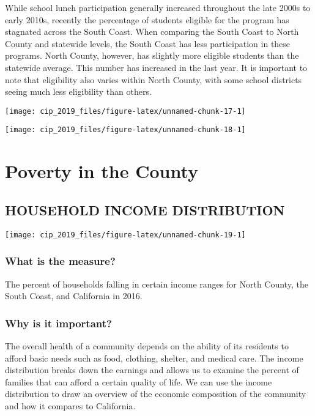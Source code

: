 \documentclass[]{book}
\theoremstyle{definition}
\theoremstyle{definition}
\theoremstyle{definition}
\theoremstyle{remark}
\begin{document}
While school lunch participation generally increased throughout the late
2000s to early 2010s, recently the percentage of students eligible for
the program has stagnated across the South Coast. When comparing the
South Coast to North County and statewide levels, the South Coast has
less participation in these programs. North County, however, has
slightly more eligible students than the statewide average. This number
has increased in the last year. It is important to note that eligibility
also varies within North County, with some school districts seeing much
less eligibility than others.

\texttt{[image: cip\_2019\_files/figure-latex/unnamed-chunk-17-1]}

\texttt{[image: cip\_2019\_files/figure-latex/unnamed-chunk-18-1]}

\section*{Poverty in the County}\label{poverty-in-the-county}

\subsection*{HOUSEHOLD INCOME
DISTRIBUTION}\label{household-income-distribution}

\texttt{[image: cip\_2019\_files/figure-latex/unnamed-chunk-19-1]}

\subsubsection*{What is the measure?}\label{what-is-the-measure-9}

The percent of households falling in certain income ranges for North
County, the South Coast, and California in 2016.

\subsubsection*{Why is it important?}\label{why-is-it-important-8}

The overall health of a community depends on the ability of its
residents to afford basic needs such as food, clothing, shelter, and
medical care. The income distribution breaks down the earnings and
allows us to examine the percent of families that can afford a certain
quality of life. We can use the income distribution to draw an overview
of the economic composition of the community and how it compares to
California.
\end{document}
